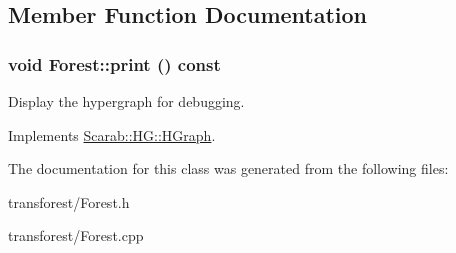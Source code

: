 \subsection{Member Function Documentation}
\hypertarget{classForest_a621a1a65d0f877bb33b15c79f9e24c4d}{
\subsubsection[{print}]{\setlength{\rightskip}{0pt plus 5cm}void Forest::print () const}}
\label{classForest_a621a1a65d0f877bb33b15c79f9e24c4d}
Display the hypergraph for debugging. 

Implements \hyperlink{classScarab_1_1HG_1_1HGraph_ab5aa11c932b28864b56f28e0babbc1c1}{Scarab::HG::HGraph}.



The documentation for this class was generated from the following files:\begin{DoxyCompactItemize}
\item 
transforest/Forest.h\item 
transforest/Forest.cpp\end{DoxyCompactItemize}
